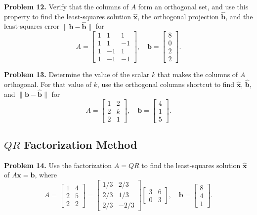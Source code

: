 \documentclass[11pt, letterpaper]{article}
\theoremstyle{definition}
\theoremstyle{remark}
\begin{document}
\textbf{Problem 12.} Verify that the columns of $A$ form an orthogonal set, and use this property to find the least-squares solution $\hat{\mathbf{x}}$, the orthogonal projection $\hat{\mathbf{b}}$, and the least-squares error $\|\mathbf{b} - \hat{\mathbf{b}}\|$ for
\[
A = \begin{bmatrix} 1 & 1 & 1 \\ 1 & 1 & -1 \\ 1 & -1 & 1 \\ 1 & -1 & -1 \end{bmatrix}, \quad \mathbf{b} = \begin{bmatrix} 8 \\ 0 \\ 2 \\ 2 \end{bmatrix}.
\]

\textbf{Problem 13.} Determine the value of the scalar $k$ that makes the columns of $A$ orthogonal. For that value of $k$, use the orthogonal columns shortcut to find $\hat{\mathbf{x}}$, $\hat{\mathbf{b}}$, and $\|\mathbf{b} - \hat{\mathbf{b}}\|$ for
\[
A = \begin{bmatrix} 1 & 2 \\ 2 & k \\ 2 & 1 \end{bmatrix}, \quad \mathbf{b} = \begin{bmatrix} 4 \\ 1 \\ 5 \end{bmatrix}.
\]

\subsection{$QR$ Factorization Method}

\textbf{Problem 14.} Use the factorization $A = QR$ to find the least-squares solution $\hat{\mathbf{x}}$ of $A\mathbf{x} = \mathbf{b}$, where
\[
A = \begin{bmatrix} 1 & 4 \\ 2 & 5 \\ 2 & 2 \end{bmatrix} = \begin{bmatrix} 1/3 & 2/3 \\ 2/3 & 1/3 \\ 2/3 & -2/3 \end{bmatrix} \begin{bmatrix} 3 & 6 \\ 0 & 3 \end{bmatrix}, \quad \mathbf{b} = \begin{bmatrix} 8 \\ 4 \\ 1 \end{bmatrix}.
\]
\end{document}
